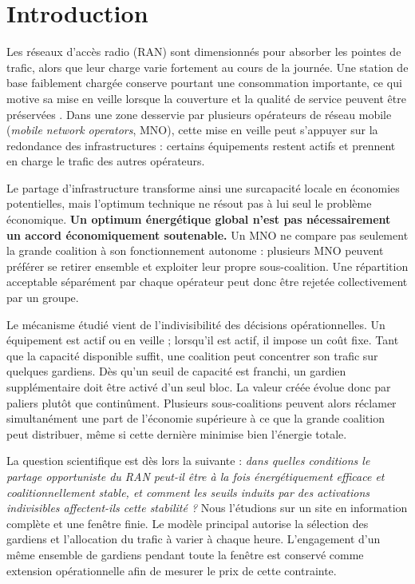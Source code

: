\section{Introduction}

Les réseaux d'accès radio (RAN) sont dimensionnés pour absorber les pointes de
trafic, alors que leur charge varie fortement au cours de la journée. Une
station de base faiblement chargée conserve pourtant une consommation
importante, ce qui motive sa mise en veille lorsque la couverture et la
qualité de service peuvent être préservées
\cite{oh2011,marsan2011}. Dans une zone desservie par plusieurs opérateurs de
réseau mobile (\emph{mobile network operators}, MNO), cette mise en veille peut
s'appuyer sur la redondance des infrastructures : certains équipements restent
actifs et prennent en charge le trafic des autres opérateurs.

Le partage d'infrastructure transforme ainsi une surcapacité locale en
économies potentielles, mais l'optimum technique ne résout pas à lui seul le
problème économique. \textbf{Un optimum énergétique global n'est pas
nécessairement un accord économiquement soutenable.} Un MNO ne compare pas
seulement la grande coalition à son fonctionnement autonome : plusieurs MNO
peuvent préférer se retirer ensemble et exploiter leur propre sous-coalition.
Une répartition acceptable séparément par chaque opérateur peut donc être
rejetée collectivement par un groupe.

Le mécanisme étudié vient de l'indivisibilité des décisions opérationnelles.
Un équipement est actif ou en veille ; lorsqu'il est actif, il impose un coût
fixe. Tant que la capacité disponible suffit, une coalition peut concentrer
son trafic sur quelques gardiens. Dès qu'un seuil de capacité est franchi, un
gardien supplémentaire doit être activé d'un seul bloc. La valeur créée évolue
donc par paliers plutôt que continûment. Plusieurs sous-coalitions peuvent
alors réclamer simultanément une part de l'économie supérieure à ce que la
grande coalition peut distribuer, même si cette dernière minimise bien
l'énergie totale.

La question scientifique est dès lors la suivante : \emph{dans quelles
conditions le partage opportuniste du RAN peut-il être à la fois
énergétiquement efficace et coalitionnellement stable, et comment les seuils
induits par des activations indivisibles affectent-ils cette stabilité ?}
Nous l'étudions sur un site en information complète et une fenêtre finie. Le
modèle principal autorise la sélection des gardiens et l'allocation du trafic
à varier à chaque heure. L'engagement d'un même ensemble de gardiens pendant
toute la fenêtre est conservé comme extension opérationnelle afin de mesurer
le prix de cette contrainte.

